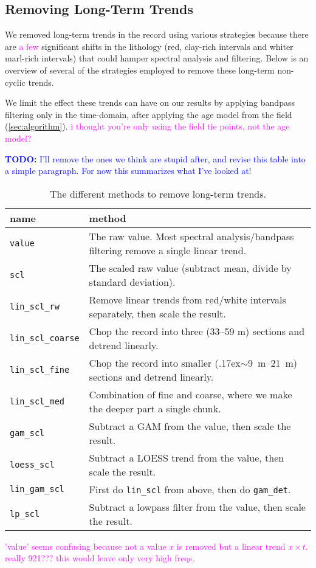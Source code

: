\documentclass[draft]{agujournal2019}
\newcommand{\appr}{\raise.17ex\hbox{$\scriptstyle\sim$}} %
\newcommand{\rez}{\textcolor{magenta}}
\newcommand{\ijk}{\textcolor{blue}}
\begin{document}
\subsection{Removing Long-Term Trends}\label{sec:detrend}

We removed long-term trends in the record using various strategies because there are \rez{a few} significant shifts in the lithology (red, clay-rich intervals and whiter marl-rich intervals) that could hamper spectral analysis and filtering.
Below is an overview of several of the strategies employed to remove these long-term non-cyclic trends.

We limit the effect these trends can have on our results by applying bandpass filtering only in the time-domain, after applying the age model from the field (\cref{sec:algorithm}). \rez{i thought you're only using the field tie points,
not the age model?}

\ijk{\textbf{TODO:} I'll remove the ones we think are stupid after, and revise this table into a simple paragraph. For now this summarizes what I've looked at!}

\begin{table}[htbp]
  \caption{\label{tab:detrend_types}
    The different methods to remove long-term trends.}
\centering
\begin{tabular}{ll}
  name & method\\
  \hline
  \texttt{value} & The raw value. Most spectral analysis/bandpass filtering remove a single linear trend.\\
  \texttt{scl} & The scaled raw value (subtract mean, divide by standard deviation). \\
  \texttt{lin\_scl\_rw} & Remove linear trends from red/white intervals separately, then scale the result.\\ %
  \texttt{lin\_scl\_coarse} & Chop the record into three (33--59 m) sections and detrend linearly.\\
  \texttt{lin\_scl\_fine} & Chop the record into smaller (\appr\qtyrange{9}{21}{\metre}) sections and detrend linearly.\\
  \texttt{lin\_scl\_med} & Combination of fine and coarse, where we make the deeper part a single chunk.\\
  \texttt{gam\_scl} & Subtract a \gls{GAM} from the value, then scale the result.\\
  \texttt{loess\_scl} & Subtract a LOESS trend from the value, then scale the result.\\
  \texttt{lin\_gam\_scl} & First do \texttt{lin\_scl} from above, then do \texttt{gam\_det}.\\ %
  \texttt{lp\_scl} & Subtract a lowpass filter from the value, then scale the result.\\
\end{tabular}
\rez{'value' seems confusing because not a value $x$ is removed but
a linear trend $x \times t$.\\
really 921??? this would leave only very high freqs.}
\end{table}
\end{document}
